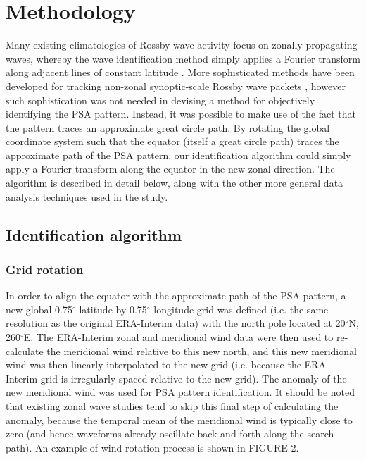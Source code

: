 \section{Methodology}

Many existing climatologies of Rossby wave activity focus on zonally propagating waves, whereby the wave identification method simply applies a Fourier transform along adjacent lines of constant latitude \citep[e.g.][]{Glatt2014,IrvingSimmonds2015}. More sophisticated methods have been developed for tracking non-zonal synoptic-scale Rossby wave packets \citep[e.g.][]{Zimin2006,Souders2014}, however such sophistication was not needed in devising a method for objectively identifying the PSA pattern. Instead, it was possible to make use of the fact that the pattern traces an approximate great circle path. By rotating the global coordinate system such that the equator (itself a great circle path) traces the approximate path of the PSA pattern, our identification algorithm could simply apply a Fourier transform along the equator in the new zonal direction. The algorithm is described in detail below, along with the other more general data analysis techniques used in the study.

\subsection{Identification algorithm}

\subsubsection{Grid rotation}

In order to align the equator with the approximate path of the PSA pattern, a new global 0.75$^{\circ}$ latitude by 0.75$^{\circ}$ longitude grid was defined (i.e. the same resolution as the original ERA-Interim data) with the north pole located at 20$^{\circ}$N, 260$^{\circ}$E. The ERA-Interim zonal and meridional wind data were then used to re-calculate the meridional wind relative to this new north, and this new meridional wind was then linearly interpolated to the new grid (i.e. because the ERA-Interim grid is irregularly spaced relative to the new grid). The anomaly of the new meridional wind was used for PSA pattern identification. It should be noted that existing zonal wave studies \citep[e.g.][]{IrvingSimmonds2015} tend to skip this final step of calculating the anomaly, because the temporal mean of the meridional wind is typically close to zero (and hence waveforms already oscillate back and forth along the search path). An example of wind rotation process is shown in FIGURE 2. 

